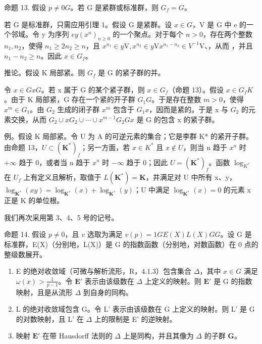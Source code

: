 命题 13. 假设 \(p \neq 0\)\(G\)。若 G 是紧群或标准群，则 \(G_f = G\)。

若 G 是标准群，只需应用引理 1。假设 G 是紧群。设 \(x \in G\)，V 是 G 中 e 的一个邻域。令 y 为序列 \(e\)\(y\)\((x^n)_{n \geqslant 0}\) 的一个聚点。对于每个 \(n > 0\)，存在两个整数 \(n_1, n_2\)，使得 \(n_1 \geqslant 2n_2 \geqslant n\)，且 \(x^{n_1} \in y\mathrm{V}, x^{n_2} \in y\mathrm{V}\)\(x^{n_1 - n_2} \in V^{-1}\mathrm{V}\)、，从而 ，并且 \(n_1 - n_2 \geqslant n\)。因此 \(x \in G_f\)。

推论。假设 K 局部紧。则 \(G_{f}\) 是 G 的紧子群的并。

令 \(x \in G\)\(x\)\(G\)。若 x 属于 G 的某个紧子群，则 \(x \in G_f\)（命题 13）。假设 \(x \in G_f\)\(K\)。由于 K 局部紧，G 存在一个紧的开子群 \(G_1\)\(G\)。于是存在整数 \(m > 0\)，使得 \(x^m \in G_1\)。由 \(G_2\) 生成的闭子群 \(x^m\) 包含于 \(G_1\)\(x\)，因而是紧的。于是 x 与 \(G_2\) 的元素交换，从而 \(G_2 \cup xG_2 \cup \cdots \cup x^{m-1}G_2\)\(G\)\(x\) 是 G 的包含 x 的紧子群。

例。假设 K 局部紧。令 U 为 A 的可逆元素的集合；它是李群 K* 的紧开子群。由命题 13，\(U \subset (\mathbf{K}^{*})_{f}\)；另一方面，若 \(x \in K^{*}\) 且 \(x \notin U\)，则当 n 趋于 \(x^{n}\) 时 \(+\infty\) 趋于 0，或者当 n 趋于 \(x^{n}\) 时 \(-\infty\) 趋于 0；因此 \(U = (\mathbf{K}^{*})_{f}\)。函数 \(\log_{K^{*}}\) 在 \(U_{f}\) 上有定义且解析，取值于 \(L(\mathbf{K}^{*}) = \mathbf{K}\)，并满足对 U 中所有 x、y，\(\log_{\mathbf{K}^{*}}(xy) = \log_{\mathbf{K}^{*}}(x) + \log_{\mathbf{K}^{*}}(y)\)；U 中满足 \(\log_{\mathbf{K}^{*}}(x) = 0\) 的元素 x 正是 K 的单位根。

我们再次采用第 3、4、5 号的记号。

命题 14. 假设 \(p \neq 0\)，且 \(v\) 选取为满足 \(v(p) = 1\)\(G\)\(E(X)\)\(L(X)\)\(G\)\(G\)。设 G 是标准群，E(X)（分别地，L(X)）是 G 的指数函数（分别地，对数函数）在 0 点的整级数展开。

\begin{enumerate}
\def\labelenumi{(\roman{enumi})}
\item
  E 的绝对收敛域（可微与解析流形，R，4.1.3）包含集合 \(\Delta\)，其中 \(x \in G\) 满足 \(\omega(x) > \frac{1}{p - 1}\)。令 \(\mathbf{E}'\) 表示由该级数在 \(\Delta\) 上定义的映射。则 \(\mathbf{E}'\) 是 G 的指数映射，且是从流形 \(\Delta\) 到自身的同构。
\item
  L 的绝对收敛域包含 G。令 L' 表示由该级数在 G 上定义的映射。则 L' 是 G 的对数映射，且 L' 在 \(\Delta\) 上的限制是 E' 的逆映射。
\item
  映射 \(\mathbf{E}'\) 在带 Hausdorff 法则的 \(\Delta\) 上是同构，并且其像为 \(\Delta\) 的子群 \(\mathbf{G}\)。
\end{enumerate}

